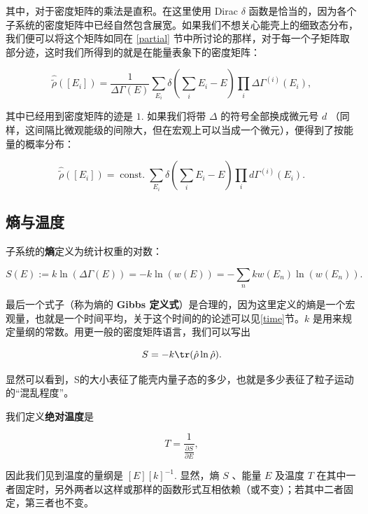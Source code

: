 其中，对于密度矩阵的乘法是直积。在这里使用 Dirac $\delta$ 函数是恰当的，因为各个子系统的密度矩阵中已经自然包含展宽。如果我们不想关心能壳上的细致态分布，我们便可以将这个矩阵如同在 \ref{partial} 节中所讨论的那样，对于每一个子矩阵取部分迹，这时我们所得到的就是在能量表象下的密度矩阵：
\begin{linenomath}\begin{equation}
\hat{\tilde{\rho}}(\left[ E_i \right]) = \frac{1}{\Delta\Gamma\left( E \right)}\sum_{E_i} \delta(\sum_{i} E_i - E)\prod_i \Delta\Gamma^{\left( i \right)}(E_i),
\end{equation}\end{linenomath}
其中已经用到密度矩阵的迹是 $1.$ 如果我们将带 $\Delta$ 的符号全部换成微元号 $d$ （同样，这间隔比微观能级的间隙大，但在宏观上可以当成一个微元），便得到了按能量的概率分布：
\begin{linenomath}\begin{equation}
\hat{\tilde{\rho}}(\left[ E_i \right]) = \operatorname{const.} \sum_{E_i} \delta(\sum_{i} E_i - E)\prod_i d\Gamma^{\left( i \right)}(E_i).
\end{equation}\end{linenomath}

\subsection{熵与温度}
\label{entropy}
子系统的\textbf{熵}定义为统计权重的对数： \begin{linenomath}\begin{equation}S(E):=k\ln\left( \Delta\Gamma\left( E \right) \right) = -k\ln\left( w(E) \right) = -\sum_n kw(E_n)\ln(w(E_n)).\end{equation}\end{linenomath}
最后一个式子（称为熵的\textbf{ Gibbs 定义式}）是合理的，因为这里定义的熵是一个宏观量，也就是一个时间平均，关于这个时间的的论述可以见\ref{time}节。$k$ 是用来规定量纲的常数。用更一般的密度矩阵语言，我们可以写出\begin{linenomath}\begin{equation}S=-k\tr(\hat\rho\ln\hat\rho).\end{equation}\end{linenomath} 显然可以看到，S的大小表征了能壳内量子态的多少，也就是多少表征了粒子运动的“混乱程度”。

我们定义\textbf{绝对温度}是\begin{linenomath}\begin{equation}T = \frac{1}{\frac{\partial{S}}{\partial{E}}},\end{equation}\end{linenomath} 因此我们见到温度的量纲是 $[E][k]^{-1}.$ 显然，熵 $S$ 、能量 $E$ 及温度 $T$ 在其中一者固定时，另外两者以这样或那样的函数形式互相依赖（或不变）；若其中二者固定，第三者也不变。

